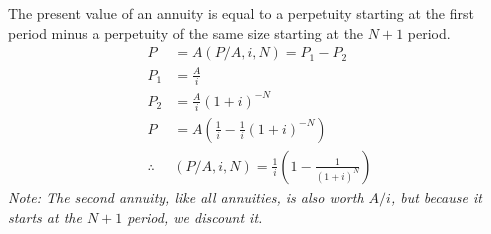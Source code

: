 \begin{definition}
    The present value of an annuity is equal to a perpetuity starting at the first period minus a perpetuity of the same size starting at the $N+1$ period.
    \begin{align}
        P          & = A(P/A, i, N) = P_1 - P_2                                  \\
        P_1        & = \frac{A}{i}                                               \\
        P_2        & = \frac{A}{i}(1+i)^{-N}                                     \\
        P          & = A(\frac{1}{i} - \frac{1}{i}(1+i)^{-N})                    \\
        \therefore & \boxed{(P/A, i, N) = \frac{1}{i}( 1 - \frac{1}{(1+i)^{N}})}
    \end{align}
    \textit{Note: The second annuity, like all annuities, is also worth $A/i$, but because it starts at the $N+1$ period, we discount it.}
\end{definition}



